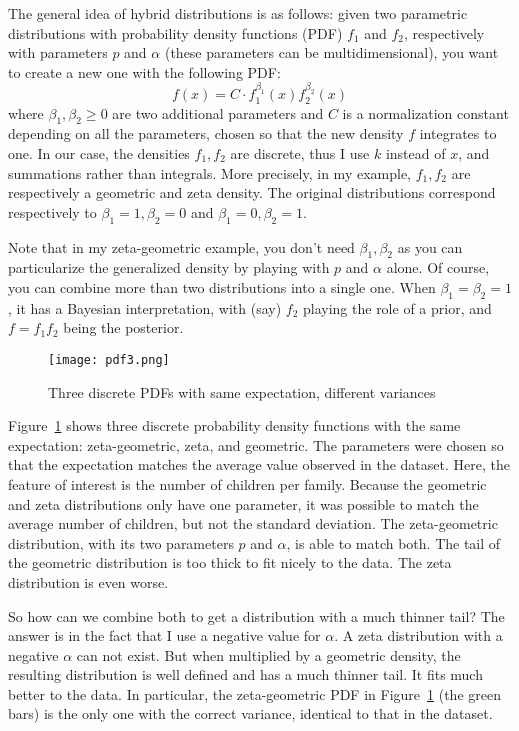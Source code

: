 \documentclass[oneside,10pt]{book}
\begin{document}
The general idea of \textcolor{index}{hybrid distributions} is as follows: given two parametric distributions with probability density functions (PDF) $f_1$ and $f_2$, respectively with parameters $p$ and $\alpha$ (these parameters can be multidimensional), you want to create a new one with the following PDF:
$$
f(x) = C\cdot f_1^{\beta_1} (x) f_2^{\beta_2}(x)
$$
where $\beta_1, \beta_2\geq 0$ are two additional parameters and $C$ is a normalization constant depending on all the parameters, chosen so that the new density $f$ integrates to one. In our case, the densities $f_1, f_2$ are discrete, thus I use $k$ instead of $x$, and summations rather than integrals. More
 precisely, in my example, $f_1, f_2$ are respectively a geometric and zeta density. The original distributions correspond 
 respectively to $\beta_1 = 1, \beta_2=0$ and $\beta_1 = 0, \beta_2=1$. 

Note that in my zeta-geometric example, you don't need $\beta_1, \beta_2$ as you can particularize the generalized density by playing with $p$ and $\alpha$ alone. Of course, you can combine more than two distributions into a single one.  When $\beta_1=\beta_2=1$, it has a Bayesian interpretation, with (say) $f_2$ playing the role of a prior, and $f=f_1 f_2$ being the posterior. 

\begin{figure}[H]
\centering
\texttt{[image: pdf3.png]}  
\caption{Three discrete PDFs with same expectation, different variances}
\label{fig:prqerw75}
\end{figure}


Figure~\ref{fig:prqerw75} shows three discrete probability density functions with the same expectation: zeta-geometric, zeta, and geometric.
 The parameters were chosen so that the expectation matches the average value observed in the dataset. Here, the feature 
of interest is the number of children per family. 
Because the geometric and zeta distributions only have one parameter, it was possible to match the average number of children, but not the standard deviation. The zeta-geometric distribution, with its two 
parameters $p$ and $\alpha$, is able to match both. The tail of the geometric distribution is too thick to fit nicely to the data. The zeta 
 distribution is even worse. 

So how can we combine both to get a distribution with a much thinner tail? The answer is in the fact that 
 I use a negative value for $\alpha$. A zeta distribution with a negative $\alpha$ can not exist. But when multiplied by a geometric density,
 the resulting distribution is well defined and has a much thinner tail. It fits much better to the data. In particular, the zeta-geometric PDF
 in Figure~\ref{fig:prqerw75} (the green bars) is the only one with the correct variance, identical to that in the dataset.
\end{document}
